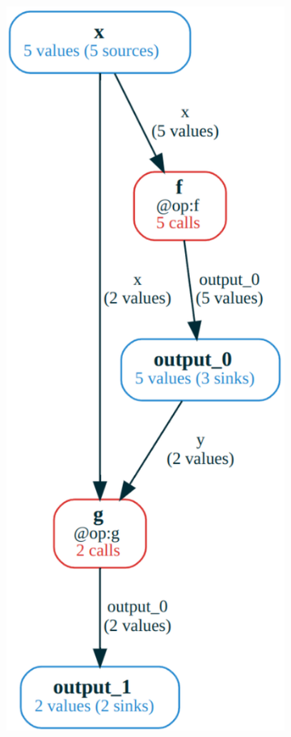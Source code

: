 \begin{figure}[htbp]
\begin{minipage}[b]{0.45\textwidth}
\begin{subfigure}[b]{\textwidth}
            \includegraphics[width=\textwidth]{img/cf.pdf}

\end{subfigure}
\end{minipage}
\end{figure}
